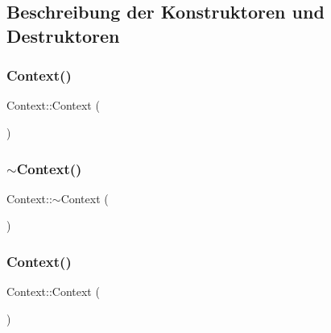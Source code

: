 \subsection{Beschreibung der Konstruktoren und Destruktoren}
\hypertarget{class_context_a652cdcd2eedc8dbd9110bd284c5d5cf0}{}\label{class_context_a652cdcd2eedc8dbd9110bd284c5d5cf0} 
\subsubsection{\texorpdfstring{Context()}{Context()}\hspace{0.1cm}{\footnotesize\ttfamily [1/2]}}
{\footnotesize\ttfamily Context\+::\+Context (\begin{DoxyParamCaption}{ }\end{DoxyParamCaption})}

\hypertarget{class_context_a2d34e4556448e40693f61d15e091b604}{}\label{class_context_a2d34e4556448e40693f61d15e091b604} 
\subsubsection{\texorpdfstring{$\sim$\+Context()}{~Context()}\hspace{0.1cm}{\footnotesize\ttfamily [1/2]}}
{\footnotesize\ttfamily Context\+::$\sim$\+Context (\begin{DoxyParamCaption}{ }\end{DoxyParamCaption})\hspace{0.3cm}{\ttfamily [virtual]}}

\hypertarget{class_context_a652cdcd2eedc8dbd9110bd284c5d5cf0}{}\label{class_context_a652cdcd2eedc8dbd9110bd284c5d5cf0} 
\subsubsection{\texorpdfstring{Context()}{Context()}\hspace{0.1cm}{\footnotesize\ttfamily [2/2]}}
{\footnotesize\ttfamily Context\+::\+Context (\begin{DoxyParamCaption}{ }\end{DoxyParamCaption})}

\hypertarget{class_context_a8be937c21e267c8d55decced9d1bcf90}{}\label{class_context_a8be937c21e267c8d55decced9d1bcf90} 

